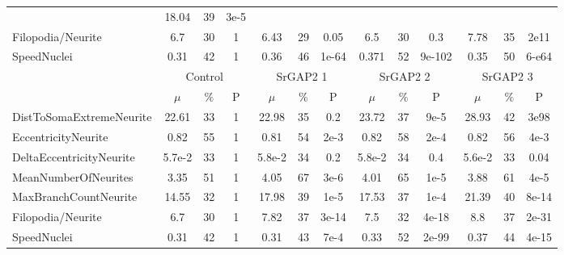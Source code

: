 \documentclass[12pt]{article}
\begin{document}
\begin{sidewaystable}
\begin{tabular}{|l||ccc||ccc||ccc||ccc|}
    &18.04 &39 &3e-5 \\
    Filopodia/Neurite &6.7 &30 &1 &6.43 &29 &0.05 &6.5 &30 &0.3 &7.78 &35 &2e11 \\
    SpeedNuclei &0.31 & 42 & 1 &0.36 & 46  & 1e-64 & 0.371 & 52 & 9e-102 &0.35  &
    50  & 6-e64 \\
    \hline \hline
    & \multicolumn{3}{|c|}{  Control  } &  \multicolumn{3}{|c|}{  SrGAP2 1  } &
    \multicolumn{3}{|c|}{   SrGAP2 2  }   &  \multicolumn{3}{|c|}{   SrGAP2 3  }  \\
    \hline
    & $\mu$ & $\%$ & P     & $\mu$ & $\%$ & P     & $\mu$ & $\%$ & P     & $\mu$
    & $\%$ & P \\
    \hline
    DistToSomaExtremeNeurite &  22.61 & 33 &  1  & 22.98 & 35 & 0.2 & 23.72 & 37
    & 9e-5 & 28.93 & 42 & 3e98 \\
    EccentricityNeurite  & 0.82 & 55 & 1 & 0.81  & 54 & 2e-3 &  0.82 & 58 & 2e-4
    & 0.82 & 56 & 4e-3  \\
    DeltaEccentricityNeurite & 5.7e-2 &33 &1  & 5.8e-2 &34 &0.2 &5.8e-2 &34 &0.4
    &5.6e-2 &33 & 0.04\\
    MeanNumberOfNeurites &3.35 &51 &1 &4.05 &67 &3e-6 &4.01 &65 &1e-5 & 3.88 &61 &4e-5 \\
    \hline
    MaxBranchCountNeurite &14.55 & 32 & 1 & 17.98 & 39 & 1e-5 & 17.53 & 37 &1e-4
    &21.39 &40 &8e-14 \\
    Filopodia/Neurite &6.7 &30 &1 &7.82 &37 &3e-14 &7.5 &32 &4e-18 &8.8 &37 &2e-31 \\
    SpeedNuclei &0.31 & 42 & 1 & 0.31  & 43 & 7e-4 &0.33 &52 &2e-99 &0.37 &44 &4e-15 \\
    \hline
  \end{tabular}
\end{sidewaystable}
\end{document}
